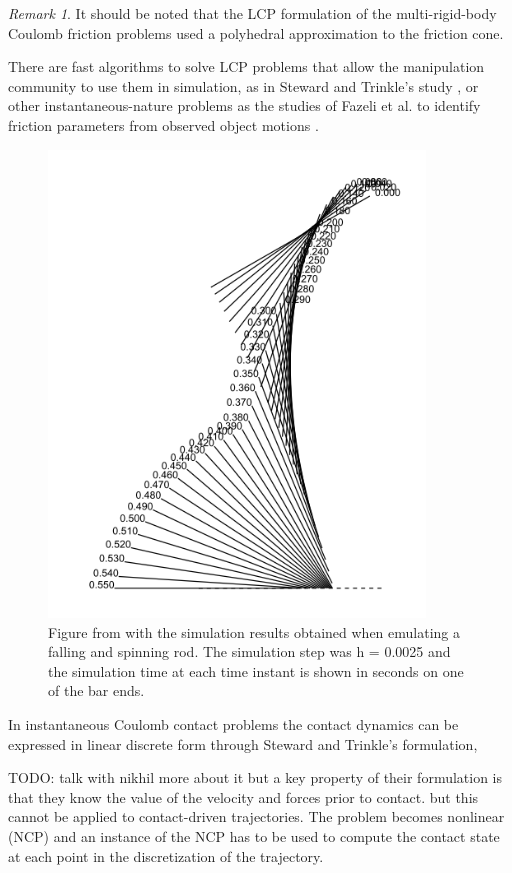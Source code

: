 \documentclass[12,twoside]{TFG-GM}
\theoremstyle{definition}
\theoremstyle{remark}
\newtheorem{remark}[theorem]{Remark}
\begin{document}
\begin{remark}
It should be noted that the LCP formulation of the multi-rigid-body Coulomb friction problems used a polyhedral approximation to the friction cone.
\end{remark}

There are fast algorithms to solve LCP problems that allow the manipulation community to use them in simulation, as in Steward and Trinkle's study \cite{lcpd}, or other instantaneous-nature problems as the studies of Fazeli et al. to identify friction parameters from observed object motions \cite{fazeli2015identifiability} \cite{fazeli2016parameter}.
\begin{figure}[htb!]
\begin{center}
\includegraphics[width=10cm]{lcp.png}
\end{center}
\caption[test caption]{\label{fig:lcp} \small{Figure from \protect\cite{lcpd} with the simulation results obtained when emulating a falling and spinning rod. The simulation step was h = 0.0025 and the simulation time at each time instant is shown in seconds on one of the bar ends.}}
\end{figure}

In instantaneous Coulomb contact problems the contact dynamics can be expressed in linear discrete form through Steward and Trinkle's formulation,

TODO: talk with nikhil more about it but a key property of their formulation is that they know the value of the velocity and forces prior to contact.  but this cannot be applied to contact-driven trajectories. The problem becomes nonlinear (NCP) and an instance of the NCP has to be used to compute the contact state at each point in the discretization of the trajectory.
\end{document}
